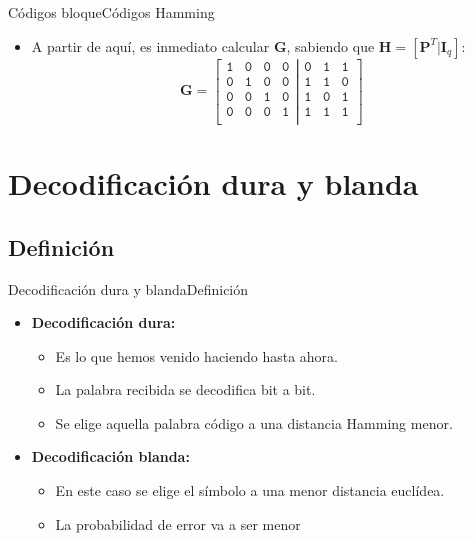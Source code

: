 \documentclass[10pt,compress]{beamer} %
\begin{document}
\begin{frame}{Códigos bloque}{Códigos Hamming}
  \begin{itemize}
    \item A partir de aquí, es inmediato calcular $\mathbf{G}$, sabiendo que $\mathbf{H} = [\mathbf{P}^T | \mathbf{I}_q ]$:
    \begin{displaymath}
      \mathbf{G} = \left [ \begin{array}{cccc}
      \mathtt{1} & \mathtt{0} & \mathtt{0} & \mathtt{0}\\
      \mathtt{0} & \mathtt{1} & \mathtt{0} & \mathtt{0}\\
      \mathtt{0} & \mathtt{0} & \mathtt{1} & \mathtt{0}\\
      \mathtt{0} & \mathtt{0} & \mathtt{0} & \mathtt{1}\\	 	
     \end{array}
     \left |
      \begin{array}{ccc}
      \mathtt{0} & \mathtt{1} & \mathtt{1} \\
      \mathtt{1} & \mathtt{1} & \mathtt{0} \\
      \mathtt{1} & \mathtt{0} & \mathtt{1} \\
      \mathtt{1} & \mathtt{1} & \mathtt{1} \\	 	
     \end{array}
     \right.
      \right ]
    \end{displaymath}
  \end{itemize}
\end{frame}


\section{Decodificación dura y blanda}
\subsection{Definición}

\begin{frame}{Decodificación dura y blanda}{Definición}
  \begin{itemize}
    \item {\bf Decodificación dura:}
    \begin{itemize}
      \item Es lo que hemos venido haciendo hasta ahora.
      \item La palabra recibida se decodifica bit a bit.
      \item Se elige aquella palabra código a una distancia Hamming menor.
    \end{itemize}
    \item {\bf Decodificación blanda:}
    \begin{itemize}
      \item En este caso se elige el símbolo a una menor distancia euclídea.
      \item La probabilidad de error va a ser menor
    \end{itemize}
  \end{itemize}
\end{frame}
\end{document}
